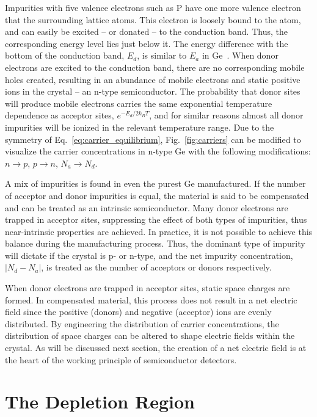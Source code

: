 Impurities with five valence electrons such as P have one more valence electron that the surrounding lattice atoms. This electron is loosely bound to the atom, and can easily be excited -- or donated -- to the conduction band. Thus, the corresponding energy level lies just below it. The energy difference with the bottom of the conduction band, $E_d$, is similar to $E_a$ in Ge~\cite{kittel}. When donor electrons are excited to the conduction band, there are no corresponding mobile holes created, resulting in an abundance of mobile electrons and static positive ions in the crystal -- an n-type semiconductor. The probability that donor sites will produce mobile electrons carries the same exponential temperature dependence as acceptor sites, $e^{-E_d/2k_BT}$, and for similar reasons almost all donor impurities will be ionized in the relevant temperature range. Due to the symmetry of Eq.~\ref{eq:carrier_equilibrium}, Fig.~\ref{fig:carriers} can be modified to visualize the carrier concentrations in n-type Ge with the following modifications: $n \rightarrow p$, $p \rightarrow n$, $N_a \rightarrow N_d$.

A mix of impurities is found in even the purest Ge manufactured. If the number of acceptor and donor impurities is equal, the material is said to be compensated and can be treated as an intrinsic semiconductor. Many donor electrons are trapped in acceptor sites, suppressing the effect of both types of impurities, thus near-intrinsic properties are achieved. In practice, it is not possible to achieve this balance during the manufacturing process. Thus, the dominant type of impurity will dictate if the crystal is p- or n-type, and the net impurity concentration, $\left|N_d-N_a\right|$, is treated as the number of acceptors or donors respectively. 

When donor electrons are trapped in acceptor sites, static space charges are formed. In compensated material, this process does not result in a net electric field since the positive (donors) and negative (acceptor) ions are evenly distributed. By engineering the distribution of carrier concentrations, the distribution of space charges can be altered to shape electric fields within the crystal. As will be discussed next section, the creation of a net electric field is at the heart of the working principle of semiconductor detectors. 

\section{The Depletion Region}\label{sec:depletion}

